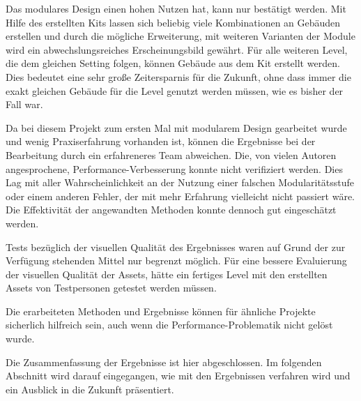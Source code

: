 \par
Das modulares Design einen hohen Nutzen hat, kann nur bestätigt werden. Mit Hilfe des erstellten Kits lassen sich beliebig viele Kombinationen an Gebäuden erstellen und durch die mögliche Erweiterung, mit weiteren Varianten der Module wird ein abwechslungsreiches Erscheinungsbild gewährt. Für alle weiteren Level, die dem gleichen Setting folgen, können Gebäude aus dem Kit erstellt werden. Dies bedeutet eine sehr große Zeitersparnis für die Zukunft, ohne dass immer die exakt gleichen Gebäude für die Level genutzt werden müssen, wie es bisher der Fall war.
\par
Da bei diesem Projekt zum ersten Mal mit modularem Design gearbeitet wurde und wenig Praxiserfahrung vorhanden ist, können die Ergebnisse bei der Bearbeitung durch ein erfahreneres Team abweichen. Die, von vielen Autoren angesprochene, Performance-Verbesserung konnte nicht verifiziert werden. Dies Lag mit aller Wahrscheinlichkeit an der Nutzung einer falschen Modularitätsstufe oder einem anderen Fehler, der mit mehr Erfahrung vielleicht nicht passiert wäre. Die Effektivität der angewandten Methoden konnte dennoch gut eingeschätzt werden. 
\par
Tests bezüglich der visuellen Qualität des Ergebnisses waren auf Grund der zur Verfügung stehenden Mittel nur begrenzt möglich. Für eine bessere Evaluierung der visuellen  Qualität der Assets, hätte ein fertiges Level  mit den erstellten Assets von Testpersonen getestet werden müssen.
\par
Die erarbeiteten Methoden und Ergebnisse können für ähnliche Projekte sicherlich hilfreich sein, auch wenn die Performance-Problematik nicht gelöst wurde.
\par
Die Zusammenfassung der Ergebnisse ist hier abgeschlossen. Im folgenden Abschnitt wird darauf eingegangen, wie mit den Ergebnissen verfahren wird und ein Ausblick in die Zukunft präsentiert.
